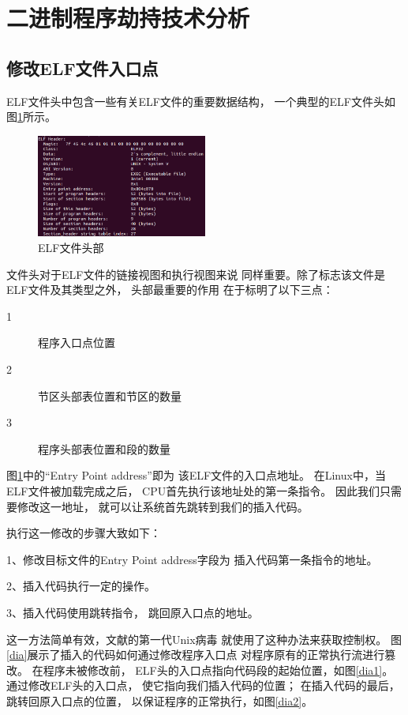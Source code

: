 
\section{二进制程序劫持技术分析}
\label{section_hijack}


\subsection{修改ELF文件入口点}

ELF文件头中包含一些有关ELF文件的重要数据结构，
一个典型的ELF文件头如图\ref{header}所示。
\begin{figure}[h!]
  \centering
  \includegraphics[width=0.5\textwidth]{figure/header.png}
  \caption{ELF文件头部}
  \label{header}
\end{figure}
文件头对于ELF文件的链接视图和执行视图来说
同样重要。除了标志该文件是ELF文件及其类型之外，
头部最重要的作用
在于标明了以下三点：

\begin{description}
  \item [1]  程序入口点位置
  \item [2]  节区头部表位置和节区的数量
  \item [3]  程序头部表位置和段的数量 
\end{description}

图\ref{header}中的“Entry Point address”即为
该ELF文件的入口点地址。
在Linux中，当ELF文件被加载完成之后，
CPU首先执行该地址处的第一条指令。
因此我们只需要修改这一地址，
就可以让系统首先跳转到我们的插入代码。

执行这一修改的步骤大致如下：

1、修改目标文件的Entry Point address字段为
插入代码第一条指令的地址。

2、插入代码执行一定的操作。

3、插入代码使用跳转指令，
跳回原入口点的地址。

这一方法简单有效，文献\cite{silvio}的第一代Unix病毒
就使用了这种办法来获取控制权。
图\ref{dia}展示了插入的代码如何通过修改程序入口点
对程序原有的正常执行流进行篡改。
在程序未被修改前，
ELF头的入口点指向代码段的起始位置，如图\ref{dia1}。
通过修改ELF头的入口点，
使它指向我们插入代码的位置；
在插入代码的最后，跳转回原入口点的位置，
以保证程序的正常执行，如图\ref{dia2}。

